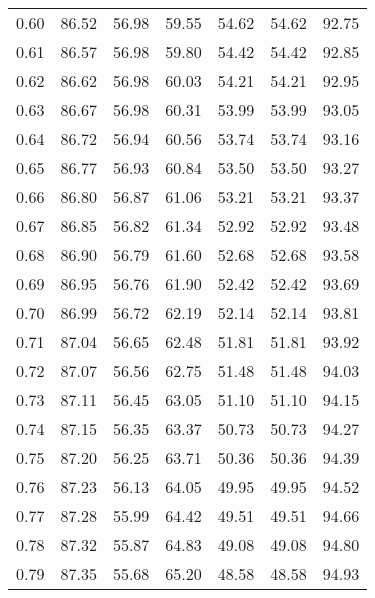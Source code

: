 \begin{tabular}{|c|c|c|c|c|c|c|}
      0.60 &     86.52 &     56.98 &      59.55 &   54.62 &      54.62 &         92.75 \\
      0.61 &     86.57 &     56.98 &      59.80 &   54.42 &      54.42 &         92.85 \\
      0.62 &     86.62 &     56.98 &      60.03 &   54.21 &      54.21 &         92.95 \\
      0.63 &     86.67 &     56.98 &      60.31 &   53.99 &      53.99 &         93.05 \\
      0.64 &     86.72 &     56.94 &      60.56 &   53.74 &      53.74 &         93.16 \\
      0.65 &     86.77 &     56.93 &      60.84 &   53.50 &      53.50 &         93.27 \\
      0.66 &     86.80 &     56.87 &      61.06 &   53.21 &      53.21 &         93.37 \\
      0.67 &     86.85 &     56.82 &      61.34 &   52.92 &      52.92 &         93.48 \\
      0.68 &     86.90 &     56.79 &      61.60 &   52.68 &      52.68 &         93.58 \\
      0.69 &     86.95 &     56.76 &      61.90 &   52.42 &      52.42 &         93.69 \\
      0.70 &     86.99 &     56.72 &      62.19 &   52.14 &      52.14 &         93.81 \\
      0.71 &     87.04 &     56.65 &      62.48 &   51.81 &      51.81 &         93.92 \\
      0.72 &     87.07 &     56.56 &      62.75 &   51.48 &      51.48 &         94.03 \\
      0.73 &     87.11 &     56.45 &      63.05 &   51.10 &      51.10 &         94.15 \\
      0.74 &     87.15 &     56.35 &      63.37 &   50.73 &      50.73 &         94.27 \\
      0.75 &     87.20 &     56.25 &      63.71 &   50.36 &      50.36 &         94.39 \\
      0.76 &     87.23 &     56.13 &      64.05 &   49.95 &      49.95 &         94.52 \\
      0.77 &     87.28 &     55.99 &      64.42 &   49.51 &      49.51 &         94.66 \\
      0.78 &     87.32 &     55.87 &      64.83 &   49.08 &      49.08 &         94.80 \\
      0.79 &     87.35 &     55.68 &      65.20 &   48.58 &      48.58 &         94.93 \\

\end{tabular}
